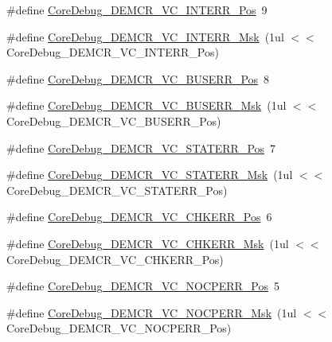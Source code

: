 \begin{DoxyCompactItemize}
\#define \hyperlink{group___c_m_s_i_s___c_m3___core_debug_ga22079a6e436f23b90308be97e19cf07e}{Core\+Debug\+\_\+\+D\+E\+M\+C\+R\+\_\+\+V\+C\+\_\+\+I\+N\+T\+E\+R\+R\+\_\+\+Pos}~9
\item 
\#define \hyperlink{group___c_m_s_i_s___c_m3___core_debug_gad6815d8e3df302d2f0ff2c2c734ed29a}{Core\+Debug\+\_\+\+D\+E\+M\+C\+R\+\_\+\+V\+C\+\_\+\+I\+N\+T\+E\+R\+R\+\_\+\+Msk}~(1ul $<$$<$ Core\+Debug\+\_\+\+D\+E\+M\+C\+R\+\_\+\+V\+C\+\_\+\+I\+N\+T\+E\+R\+R\+\_\+\+Pos)
\item 
\#define \hyperlink{group___c_m_s_i_s___c_m3___core_debug_gab8e3d8f0f9590a51bbf10f6da3ad6933}{Core\+Debug\+\_\+\+D\+E\+M\+C\+R\+\_\+\+V\+C\+\_\+\+B\+U\+S\+E\+R\+R\+\_\+\+Pos}~8
\item 
\#define \hyperlink{group___c_m_s_i_s___c_m3___core_debug_ga9d29546aefe3ca8662a7fe48dd4a5b2b}{Core\+Debug\+\_\+\+D\+E\+M\+C\+R\+\_\+\+V\+C\+\_\+\+B\+U\+S\+E\+R\+R\+\_\+\+Msk}~(1ul $<$$<$ Core\+Debug\+\_\+\+D\+E\+M\+C\+R\+\_\+\+V\+C\+\_\+\+B\+U\+S\+E\+R\+R\+\_\+\+Pos)
\item 
\#define \hyperlink{group___c_m_s_i_s___c_m3___core_debug_ga16f0d3d2ce1e1e8cd762d938ac56c4ac}{Core\+Debug\+\_\+\+D\+E\+M\+C\+R\+\_\+\+V\+C\+\_\+\+S\+T\+A\+T\+E\+R\+R\+\_\+\+Pos}~7
\item 
\#define \hyperlink{group___c_m_s_i_s___c_m3___core_debug_gaa38b947d77672c48bba1280c0a642e19}{Core\+Debug\+\_\+\+D\+E\+M\+C\+R\+\_\+\+V\+C\+\_\+\+S\+T\+A\+T\+E\+R\+R\+\_\+\+Msk}~(1ul $<$$<$ Core\+Debug\+\_\+\+D\+E\+M\+C\+R\+\_\+\+V\+C\+\_\+\+S\+T\+A\+T\+E\+R\+R\+\_\+\+Pos)
\item 
\#define \hyperlink{group___c_m_s_i_s___c_m3___core_debug_ga10fc7c53bca904c128bc8e1a03072d50}{Core\+Debug\+\_\+\+D\+E\+M\+C\+R\+\_\+\+V\+C\+\_\+\+C\+H\+K\+E\+R\+R\+\_\+\+Pos}~6
\item 
\#define \hyperlink{group___c_m_s_i_s___c_m3___core_debug_ga2f98b461d19746ab2febfddebb73da6f}{Core\+Debug\+\_\+\+D\+E\+M\+C\+R\+\_\+\+V\+C\+\_\+\+C\+H\+K\+E\+R\+R\+\_\+\+Msk}~(1ul $<$$<$ Core\+Debug\+\_\+\+D\+E\+M\+C\+R\+\_\+\+V\+C\+\_\+\+C\+H\+K\+E\+R\+R\+\_\+\+Pos)
\item 
\#define \hyperlink{group___c_m_s_i_s___c_m3___core_debug_gac9d13eb2add61f610d5ced1f7ad2adf8}{Core\+Debug\+\_\+\+D\+E\+M\+C\+R\+\_\+\+V\+C\+\_\+\+N\+O\+C\+P\+E\+R\+R\+\_\+\+Pos}~5
\item 
\#define \hyperlink{group___c_m_s_i_s___c_m3___core_debug_ga03ee58b1b02fdbf21612809034562f1c}{Core\+Debug\+\_\+\+D\+E\+M\+C\+R\+\_\+\+V\+C\+\_\+\+N\+O\+C\+P\+E\+R\+R\+\_\+\+Msk}~(1ul $<$$<$ Core\+Debug\+\_\+\+D\+E\+M\+C\+R\+\_\+\+V\+C\+\_\+\+N\+O\+C\+P\+E\+R\+R\+\_\+\+Pos)
$$
\end{DoxyCompactItemize}

